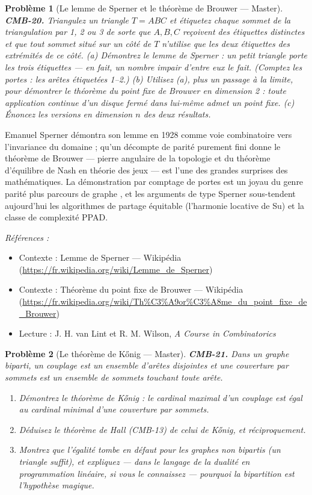 \documentclass[11pt]{article}
\newtheorem{problem}{Problème}
\newenvironment{refs}{\par\small\noindent\emph{Références :}\begin{itemize}\setlength\itemsep{0pt}}{\end{itemize}\normalsize}
\begin{document}
\bigskip

\begin{problem}[{Le lemme de Sperner et le théorème de Brouwer --- Master}]
\textbf{CMB-20.} Triangulez un triangle $ T = ABC $ et étiquetez chaque
sommet de la triangulation par 1, 2 ou 3 de sorte que $ A, B, C $ reçoivent des étiquettes
distinctes et que tout sommet situé sur un côté de $ T $ n'utilise que les deux étiquettes des
extrémités de ce côté. (a) Démontrez le lemme de Sperner : un petit triangle porte les trois
étiquettes --- en fait, un nombre impair d'entre eux le fait. (Comptez les portes : les arêtes
étiquetées 1--2.) (b) Utilisez (a), plus un passage à la limite, pour démontrer le théorème du
point fixe de Brouwer en dimension 2 : toute application continue d'un disque fermé dans lui-même
admet un point fixe. (c) Énoncez les versions en dimension $ n $ des deux résultats.
\end{problem}

\noindent Emanuel Sperner démontra son lemme en 1928 comme voie combinatoire vers
l'invariance du domaine ; qu'un décompte de parité purement fini donne le théorème de Brouwer ---
pierre angulaire de la topologie et du théorème d'équilibre de Nash en théorie des jeux --- est
l'une des grandes surprises des mathématiques. La démonstration par comptage de portes est un
joyau du genre \og{} parité plus parcours de graphe \fg{}, et les arguments de type Sperner sous-tendent
aujourd'hui les algorithmes de partage équitable (l'harmonie locative de Su) et la classe de
complexité PPAD.

\begin{refs}
\item Contexte : Lemme de Sperner --- Wikipédia (\url{https://fr.wikipedia.org/wiki/Lemme_de_Sperner})
\item Contexte : Théorème du point fixe de Brouwer --- Wikipédia (\url{https://fr.wikipedia.org/wiki/Th%C3%A9or%C3%A8me_du_point_fixe_de_Brouwer})
\item Lecture : J. H. van Lint et R. M. Wilson, \textit{A Course in Combinatorics}
\end{refs}

\bigskip

\begin{problem}[{Le théorème de K\H{o}nig --- Master}]
\textbf{CMB-21.} Dans un graphe biparti, un couplage est un ensemble d'arêtes disjointes et
une couverture par sommets est un ensemble de sommets touchant toute arête.
\begin{enumerate}
\item[(a)] Démontrez le théorème de K\H{o}nig : le cardinal maximal d'un couplage est égal au cardinal
minimal d'une couverture par sommets.
\item[(b)] Déduisez le théorème de Hall (CMB-13) de celui de K\H{o}nig, et réciproquement.
\item[(c)] Montrez que l'égalité tombe en défaut pour les graphes non bipartis (un triangle suffit), et
expliquez --- dans le langage de la dualité en programmation linéaire, si vous le connaissez ---
pourquoi la bipartition est l'hypothèse magique.
\end{enumerate}

\end{problem}
\end{document}
